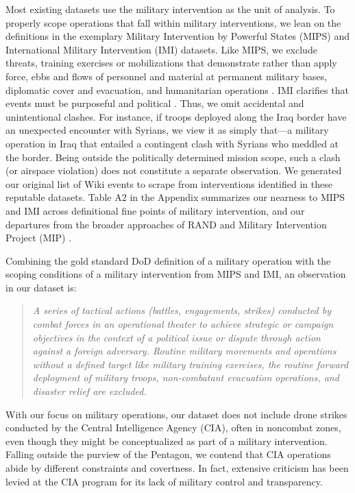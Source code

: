 \documentclass[fleqn,12pt]{article}
\begin{document}
Most existing datasets use the military intervention as the unit of analysis. To properly scope operations that fall within military interventions, we lean on the definitions in the exemplary Military Intervention by Powerful States (MIPS) and International Military Intervention (IMI) datasets. Like MIPS, we exclude threats, training exercises or mobilizations that demonstrate rather than apply force, ebbs and flows of personnel and material at permanent military bases, diplomatic cover and evacuation, and humanitarian operations \citep{sullivan_militaryinterventionpowerful_2009}. IMI clarifies that events must be purposeful and political \citep{pearson_internationalmilitaryinterventions_1988, pickering_internationalmilitaryintervention_2009}. Thus, we omit accidental and unintentional clashes. For instance, if troops deployed along the Iraq border have an unexpected encounter with Syrians, we view it as simply that—a military operation in Iraq that entailed a contingent clash with Syrians who meddled at the border. Being outside the politically determined mission scope, such a clash (or airspace violation) does not constitute a separate observation. We generated our original list of Wiki events to scrape from interventions identified in these reputable datasets. Table A2 in the Appendix summarizes our nearness to MIPS and IMI across definitional fine points of military intervention, and our departures from the broader approaches of RAND \citep{kavanagh_characteristicssuccessfulmilitary_2019} and Military Intervention Project (MIP) \citep{kushi_introducingmilitaryintervention_2022}. 

Combining the gold standard DoD definition of a military operation with the scoping conditions of a military intervention from MIPS and IMI, an observation in our dataset is:

    \begin{quote}\singlespacing
    \textit{A series of tactical actions (battles, engagements, strikes) conducted by combat forces in an operational theater to achieve strategic or campaign objectives in the context of a political issue or dispute through action against a foreign adversary. Routine military movements and operations without a defined target like military training exercises, the routine forward deployment of military troops, non-combatant evacuation operations, and disaster relief are excluded.}
    \end{quote}

With our focus on military operations, our dataset does not include drone strikes conducted by the Central Intelligence Agency (CIA), often in noncombat zones, even though they might be conceptualized as part of a military intervention. Falling outside the purview of the Pentagon, we contend that CIA operations abide by different constraints and covertness. In fact, extensive criticism has been levied at the CIA program for its lack of military control and transparency. 
\end{document}

